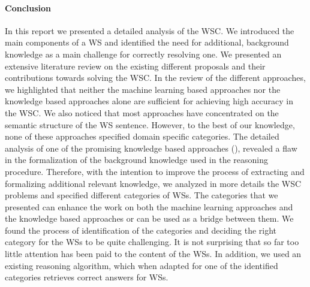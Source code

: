 
\paragraph{Conclusion}
In this report we presented a detailed analysis of the WSC. We introduced the main components of a WS and identified the need for  additional, background knowledge as a main challenge for correctly resolving one. We presented an extensive literature review on the existing different proposals and their contributions towards solving the WSC. In the review of the different approaches, we highlighted that neither the machine learning based approaches nor the knowledge based approaches alone are sufficient for achieving high accuracy in the WSC. We also noticed that most approaches have concentrated on the semantic structure of the WS sentence. However, to the best of our knowledge, none of these approaches specified domain specific categories. The detailed analysis of one of the promising knowledge based approaches (\cite{2018CommonsenseKT}), revealed a flaw in the formalization of the background knowledge used in the reasoning procedure. Therefore, with the intention to improve the process of extracting and formalizing additional relevant knowledge, we analyzed in more details the WSC problems and specified different categories of WSs. The categories that we presented can enhance the work on both the machine learning approaches and the knowledge based approaches or can be used as a bridge between them. We found the process of identification of the categories and deciding the right category for the WSs to be quite challenging. It is not surprising that so far too little attention has been paid to the content of the WSs. In addition, we used an existing reasoning algorithm, which when adapted for one of the identified categories retrieves correct answers for WSs. 

